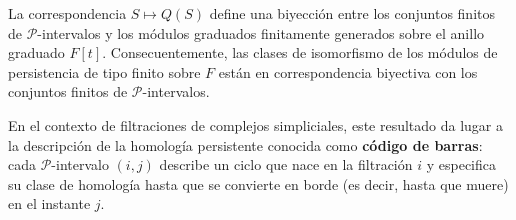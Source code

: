 \begin{corolario}
	La correspondencia $S \mapsto Q(S)$ define una biyección entre los conjuntos finitos
	de $\mathcal{P}$-intervalos y los módulos graduados finitamente generados sobre
	el anillo graduado $F[t]$. Consecuentemente, las clases de isomorfismo de los módulos
	de persistencia de tipo finito sobre $F$ están en correspondencia biyectiva con
	los conjuntos finitos de $\mathcal{P}$-intervalos.
\end{corolario}

En el contexto de filtraciones de complejos simpliciales, este resultado da
lugar a la descripción de la homología persistente conocida como \textbf{código
	de barras}: cada $\mathcal{P}$-intervalo $(i, j)$ describe un ciclo que nace en
la filtración $i$ y especifica su clase de homología hasta que se convierte en
borde (es decir, hasta que muere) en el instante $j$.%

